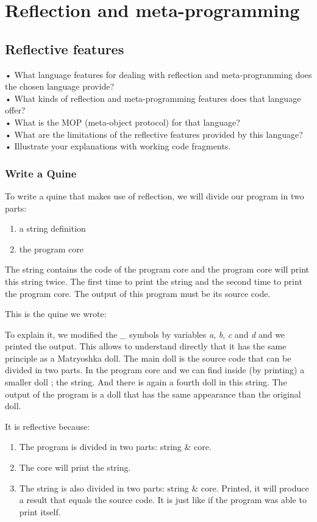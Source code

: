 \section{Reflection and meta-programming}
\subsection{Reflective features}
•	What language features for dealing with reflection and meta-programming does the chosen language provide?\\
•	What kinds of reflection and meta-programming features does that language offer?\\
•	What is the MOP (meta-object protocol) for that language?\\
•	What are the limitations of the reflective features provided by this language?\\
•	Illustrate your explanations with working code fragments.\\

\subsubsection{Write a Quine}
To write a quine that makes use of reflection, we will divide our program in two parts:
\begin{enumerate}
    \item a string definition
    \item the program core
\end{enumerate}
The string contains the code of the program core and the program core will print this string twice. The first time to print the string and the second time to print the program core. The output of this program must be its source code.

This is the quine we wrote:


To explain it, we modified the \emph{\_} symbols by variables \emph{a}, \emph{b}, \emph{c} and \emph{d} and we printed the output. This allows to understand directly that it has the same principle as a Matryoshka doll. The main doll is the source code that can be divided in two parts. In the program core and we can find inside (by printing) a smaller doll ; the string. And there is again a fourth doll in this string. The output of the program is a doll that has the same appearance than the original doll.


It is reflective because:
\begin{enumerate}
    \item The program is divided in two parts: string \& core.
    \item The core will print the string.
    \item The string is also divided in two parts: string \& core. Printed, it will produce a result that equals the source code. It is just like if the program was able to print itself. 
\end{enumerate}

